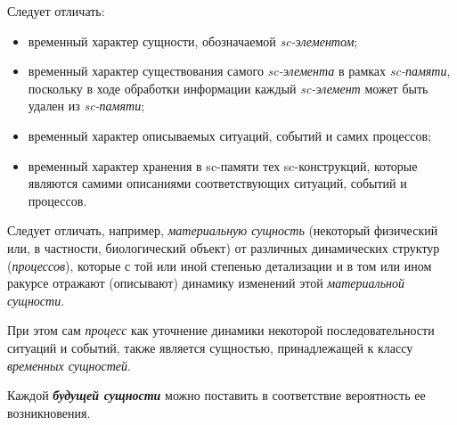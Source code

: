 Следует отличать:
	\begin{itemize}
		\item временный характер сущности, обозначаемой \textit{sc-элементом};
		\item временный характер существования самого \textit{sc-элемента} в рамках \textit{sc-памяти}, поскольку в ходе обработки информации каждый \textit{sc-элемент} может быть удален из \textit{sc-памяти}; 
		\item временный характер описываемых ситуаций, событий и самих процессов;
		\item временный характер хранения в sc-памяти тех sc-конструкций, которые являются самими описаниями соответствующих ситуаций, событий и процессов.
	\end{itemize}

		
Следует отличать, например, \textit{материальную сущность} (некоторый физический или, в частности, биологический объект) от различных динамических структур (\textit{процессов}), которые с той или иной степенью детализации и в том или ином ракурсе отражают (описывают) динамику изменений этой \textit{материальной сущности}. 
			
При этом сам \textit{процесс} как уточнение динамики некоторой последовательности ситуаций и событий, также является сущностью, принадлежащей к классу \textit{временных сущностей}.
		
\begin{SCn}
		
		
\end{SCn}

Каждой \textbf{\textit{будущей сущности}} можно поставить в соответствие вероятность ее возникновения.
	
\begin{SCn}
\end{SCn}

